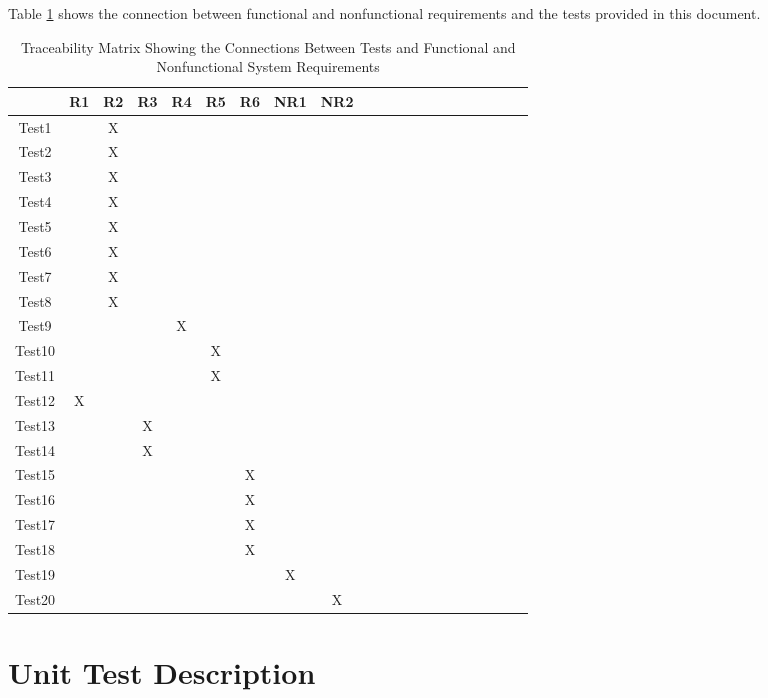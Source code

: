 \documentclass[12pt, titlepage]{article}
\begin{document}
Table \ref{Table:A_trace} shows the connection between functional and nonfunctional requirements and the tests provided in this document. 

\begin{table}[h!]
	\centering
	\begin{tabular}{|c|c|c|c|c|c|c|c|c|c|c|c|c|c|c|c|c|c|c|c|c|}
		\hline        
		& R1 & R2 & R3 & R4 & R5 & R6 & NR1 & NR2 \\
		\hline
		Test1        & &X & & & & & &   \\ \hline
		Test2        & &X & & & & & &   \\ \hline
		Test3        & &X & & & & & &  \\ \hline
		Test4        & &X & & & & & & \\ \hline
		Test5        & &X & & & & & &   \\ \hline
		Test6        & &X & & & & & &  \\ \hline
		Test7        & &X & & & & & &  \\ \hline
		Test8        & &X & & & & & &  \\ \hline
		Test9        & & & &X & & & &  \\ \hline
		Test10       & & & & &X & & &  \\ \hline
		Test11       & & & & & X& & &  \\ \hline
		Test12       &X & & & & & & &  \\ \hline
		Test13       & & &X & & & & &  \\ \hline
		Test14       & & &X & & & & &  \\ \hline
		Test15       & & & & & &X & &  \\ \hline
		Test16       & & & & & &X & &  \\ \hline
		Test17       & & & & & &X & &  \\ \hline
		Test18       & & & & & &X & &  \\ \hline
		Test19       & & & & & & &X &  \\ \hline
		Test20       & & & & & & & &X  \\ \hline
	\end{tabular}
\caption{Traceability Matrix Showing the Connections Between Tests and Functional and Nonfunctional System Requirements}
\label{Table:A_trace}
\end{table}

\section{Unit Test Description} \label{utest}
\end{document}
